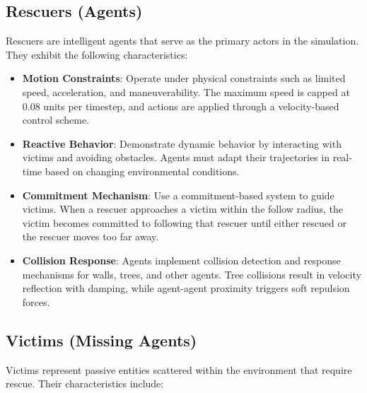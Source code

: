 \documentclass[11pt,a4paper]{article}
\begin{document}
\subsection{Rescuers (Agents)}
\label{subsec:rescuers}

Rescuers are intelligent agents that serve as the primary actors in the simulation.
They exhibit the following characteristics:

\begin{itemize}
    \item \textbf{Motion Constraints}: Operate under physical constraints such as limited speed, acceleration, and maneuverability.
    The maximum speed is capped at 0.08 units per timestep, and actions are applied through a velocity-based control scheme.

    \item \textbf{Reactive Behavior}: Demonstrate dynamic behavior by interacting with victims and avoiding obstacles.
    Agents must adapt their trajectories in real-time based on changing environmental conditions.

    \item \textbf{Commitment Mechanism}: Use a commitment-based system to guide victims.
    When a rescuer approaches a victim within the follow radius, the victim becomes committed to following that rescuer until either rescued or the rescuer moves too far away.

    \item \textbf{Collision Response}: Agents implement collision detection and response mechanisms for walls, trees, and other agents.
    Tree collisions result in velocity reflection with damping, while agent-agent proximity triggers soft repulsion forces.
\end{itemize}

\subsection{Victims (Missing Agents)}
\label{subsec:victims}

Victims represent passive entities scattered within the environment that require rescue.
Their characteristics include:
\end{document}
